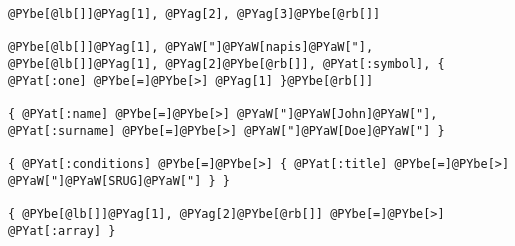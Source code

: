 \begin{Verbatim}[commandchars=@\[\]]
@PYbe[@lb[]]@PYag[1], @PYag[2], @PYag[3]@PYbe[@rb[]]

@PYbe[@lb[]]@PYag[1], @PYaW["]@PYaW[napis]@PYaW["], @PYbe[@lb[]]@PYag[1], @PYag[2]@PYbe[@rb[]], @PYat[:symbol], { @PYat[:one] @PYbe[=]@PYbe[>] @PYag[1] }@PYbe[@rb[]]

{ @PYat[:name] @PYbe[=]@PYbe[>] @PYaW["]@PYaW[John]@PYaW["], @PYat[:surname] @PYbe[=]@PYbe[>] @PYaW["]@PYaW[Doe]@PYaW["] }

{ @PYat[:conditions] @PYbe[=]@PYbe[>] { @PYat[:title] @PYbe[=]@PYbe[>] @PYaW["]@PYaW[SRUG]@PYaW["] } }

{ @PYbe[@lb[]]@PYag[1], @PYag[2]@PYbe[@rb[]] @PYbe[=]@PYbe[>] @PYat[:array] }
\end{Verbatim}
